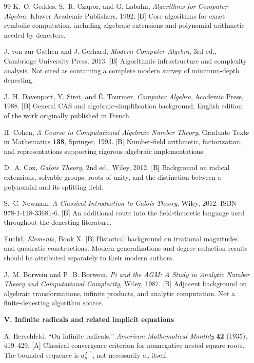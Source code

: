 \documentclass[11pt,a4paper]{article}
\numberwithin{equation}{section}
\theoremstyle{definition}\newtheorem{definition}[theorem]{Definition}
\theoremstyle{remark}\newtheorem{remark}[theorem]{Remark}
\newcommand{\status}[1]{\textsf{\footnotesize[#1]}}
\newcommand{\bibgroup}[1]{\par\Needspace{7\baselineskip}\bigskip\item[]\textbf{#1}\par\smallskip}
\begin{document}
\begin{thebibliography}{99}
 K.~O. Geddes, S.~R. Czapor, and G. Labahn, \emph{Algorithms for Computer Algebra}, Kluwer Academic Publishers, 1992. \status{B}
Core algorithms for exact symbolic computation, including algebraic extensions and polynomial arithmetic needed by denesters.

 J. von zur Gathen and J. Gerhard, \emph{Modern Computer Algebra}, 3rd ed., Cambridge University Press, 2013. \status{B}
Algorithmic infrastructure and complexity analysis. Not cited as containing a complete modern survey of minimum-depth denesting.

 J.~H. Davenport, Y. Siret, and \'E. Tournier, \emph{Computer Algebra}, Academic Press, 1988. \status{B}
General CAS and algebraic-simplification background; English edition of the work originally published in French.

 H. Cohen, \emph{A Course in Computational Algebraic Number Theory}, Graduate Texts in Mathematics \textbf{138}, Springer, 1993. \status{B}
Number-field arithmetic, factorization, and representations supporting rigorous algebraic implementations.

 D.~A. Cox, \emph{Galois Theory}, 2nd ed., Wiley, 2012. \status{B}
Background on radical extensions, solvable groups, roots of unity, and the distinction between a polynomial and its splitting field.

 S.~C. Newman, \emph{A Classical Introduction to Galois Theory}, Wiley, 2012. ISBN 978-1-118-33681-6. \status{B}
An additional route into the field-theoretic language used throughout the denesting literature.

 Euclid, \emph{Elements}, Book X. \status{B}
Historical background on irrational magnitudes and quadratic constructions. Modern generalizations and degree-reduction results should be attributed separately to their modern authors.

 J.~M. Borwein and P.~B. Borwein, \emph{Pi and the AGM: A Study in Analytic Number Theory and Computational Complexity}, Wiley, 1987. \status{B}
Adjacent background on algebraic transformations, infinite products, and analytic computation. Not a finite-denesting algorithm source.

\bibgroup{V. Infinite radicals and related implicit equations}

 A. Herschfeld, ``On infinite radicals,'' \emph{American Mathematical Monthly} \textbf{42} (1935), 419--429. \status{A}
Classical convergence criterion for nonnegative nested square roots. The bounded sequence is $a_n^{2^{-n}}$, not necessarily $a_n$ itself.


\end{thebibliography}
\end{document}
